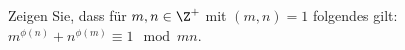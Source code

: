 
\begin{exercise}

Zeigen Sie, dass für $m, n \in \Z^+$ mit $(m,n) = 1$ folgendes gilt:
$m^{\phi(n)} + n^{\phi(m)} \equiv 1 \mod{mn}$.

\end{exercise}


\begin{solution}

\phantom{}

\end{solution}

